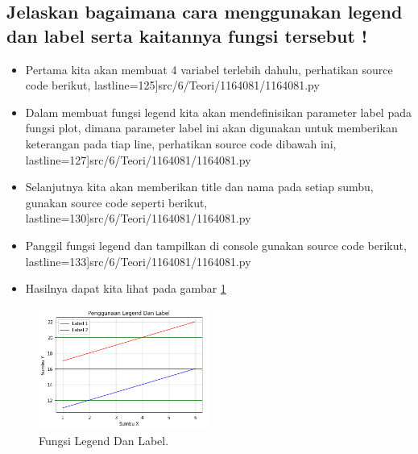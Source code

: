 \subsection{Jelaskan bagaimana cara menggunakan legend dan label serta kaitannya fungsi tersebut !}
\begin{itemize}

	\item Pertama kita akan membuat 4 variabel terlebih dahulu, perhatikan source code berikut,
	          lastline=125]{src/6/Teori/1164081/1164081.py}
	\item Dalam membuat fungsi legend kita akan mendefinisikan parameter label pada fungsi plot, dimana parameter label ini 			         akan digunakan untuk memberikan keterangan pada tiap line, perhatikan source code dibawah ini,
	          lastline=127]{src/6/Teori/1164081/1164081.py}
	\item Selanjutnya kita akan memberikan title dan nama pada setiap sumbu, gunakan source code seperti berikut,
	          lastline=130]{src/6/Teori/1164081/1164081.py}
	\item Panggil fungsi legend dan tampilkan di console gunakan source code berikut,
	          lastline=133]{src/6/Teori/1164081/1164081.py}
	\item Hasilnya dapat kita lihat pada gambar \ref{8}
\end{itemize}
	\begin{figure}[!htbp!]
		\centerline{\includegraphics[width=0.5\textwidth]{figures/6/Teori/1164081/1164081_8.png}}
		\caption{Fungsi Legend Dan Label.}
		\label{8}
	\end{figure}
